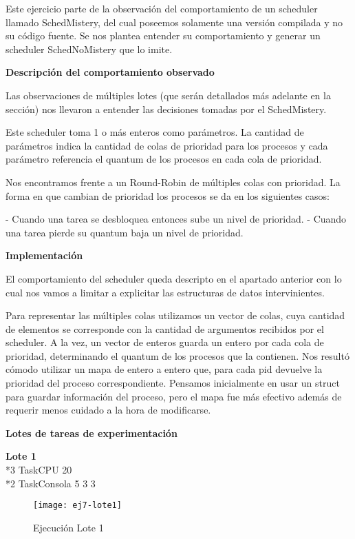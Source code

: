 Este ejercicio parte de la observación del comportamiento de un scheduler llamado SchedMistery, del cual poseemos solamente una versión compilada y no su código fuente. Se nos plantea entender su comportamiento y generar un scheduler SchedNoMistery que lo imite.

\bigskip

\textbf{Descripción del comportamiento observado}

Las observaciones de múltiples lotes (que serán detallados más adelante en la sección) nos llevaron a entender las decisiones tomadas por el SchedMistery.

Este scheduler toma 1 o más enteros como parámetros. La cantidad de parámetros indica la cantidad de colas de prioridad para los procesos y cada parámetro referencia el quantum de los procesos en cada cola de prioridad.

Nos encontramos frente a un Round-Robin de múltiples colas con prioridad. La forma en que cambian de prioridad los procesos se da en los siguientes casos:

- Cuando una tarea se desbloquea entonces sube un nivel de prioridad.
- Cuando una tarea pierde su quantum baja un nivel de prioridad.


\textbf{Implementación}

El comportamiento del scheduler queda descripto en el apartado anterior con lo cual nos vamos a limitar a explicitar las estructuras de datos intervinientes.

Para representar las múltiples colas utilizamos un vector de colas, cuya cantidad de elementos se corresponde con la cantidad de argumentos recibidos por el scheduler.
A la vez, un vector de enteros guarda un entero por cada cola de prioridad, determinando el quantum de los procesos que la contienen.
Nos resultó cómodo utilizar un mapa de entero a entero que, para cada pid devuelve la prioridad del proceso correspondiente.
Pensamos inicialmente en usar un struct para guardar información del proceso, pero el mapa fue más efectivo adem\'as de requerir menos cuidado a la hora de modificarse.

\bigskip

\textbf{Lotes de tareas de experimentación}

\bigskip

\textbf{Lote 1} \\
*3 TaskCPU 20 \\
*2 TaskConsola 5 3 3

\begin{figure}[h]
    \texttt{[image: ej7-lote1]}
    \caption{Ejecución Lote 1}
    \label{Lote1}
\end{figure}

